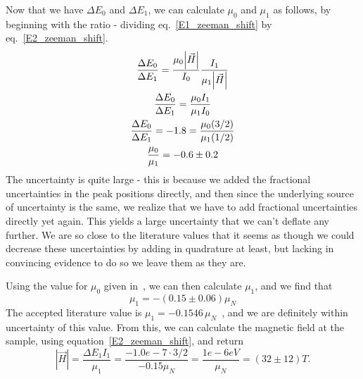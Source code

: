 \documentclass[reprint, nobibnotes, amssymb, amsmath, amsfonts, mathtools, mathrsfs, floatfix]{revtex4-1}
\begin{document}
      Now that we have $\Delta E_0$ and $\Delta E_1$, we can calculate $\mu_0$ and $\mu_1$ as follows, by beginning with the ratio - dividing eq.~\ref{E1_zeeman_shift} by eq.~\ref{E2_zeeman_shift}.
      \begin{gather}
        \frac{\Delta E_0}{\Delta E_1} = \frac{\mu_0 \abs{\vec{H}}}{I_0} \frac{I_1}{\mu_1 \abs{\vec{H}}} \\
        \frac{\Delta E_0}{\Delta E_1} = \frac{\mu_0 I_1}{\mu_1 I_0} \\
        \frac{\Delta E_0}{\Delta E_1} = -1.8 = \frac{\mu_0 (3/2)}{\mu_1 (1/2)} \\
        \frac{\mu_0}{\mu_1} = -0.6 \pm 0.2
      \end{gather}
      The uncertainty is quite large - this is because we added the fractional uncertainties in the peak positions directly, and then since the underlying source of uncertainty is the same, we realize that we have to add fractional uncertainties directly yet again.  This yields a large uncertainty that we can't deflate any further.  We are so close to the literature values that it seems as though we could decrease these uncertainties by adding in quadrature at least, but lacking in convincing evidence to do so we leave them as they are.

      Using the value for $\mu_0$ given in~\cite{lab_manual}, we can then calculate $\mu_1$, and we find that
      \begin{equation}
        \mu_1 = -(0.15\pm0.06)\mu_N
      \end{equation}
      The accepted literature value is $\mu_1 = -0.1546\,\mu_N$~\cite{mu_1}, and we are definitely within uncertainty of this value.  From this, we can calculate the magnetic field at the sample, using equation~\ref{E2_zeeman_shift}, and return
      \begin{equation}
        |\vec{H}| = \frac{\Delta E_1 I_1}{\mu_1} = \frac{-1.0e-7 \cdot 3/2}{-0.15 \mu_N} = \frac{1e-6 eV}{\mu_N} = (32\pm12) T.
      \end{equation}
\end{document}
